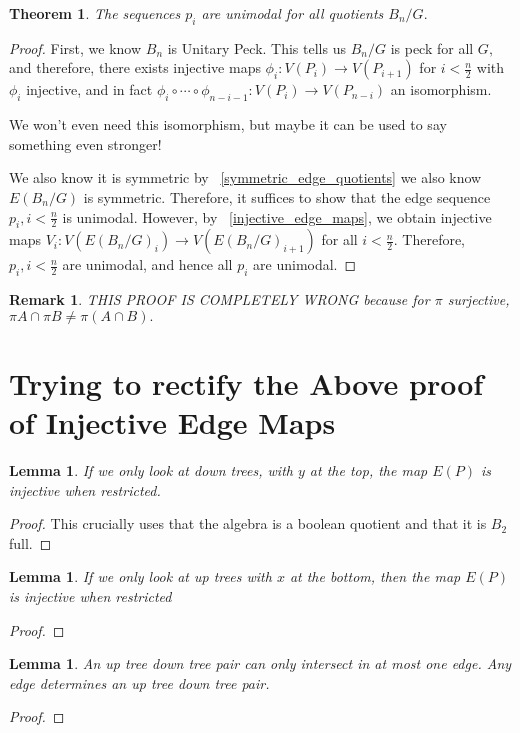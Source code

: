 \documentclass{amsart}
\newtheorem{lem}[subsubsection]{Lemma}
\newtheorem{thm}[subsubsection]{Theorem}
\newtheorem{rem}[subsubsection]{Remark}
\begin{document}
\begin{thm}
The sequences $p_i$ are unimodal for all quotients $B_n/G.$ 
\end{thm}
\begin{proof}
First, we know $B_n$ is Unitary Peck. This tells us $B_n/G$ is peck for all $G,$ and therefore, there exists injective maps $\phi_i:V(P_i) \rightarrow V(P_{i+1})$ for $i <\frac{n}{2}$	with $\phi_i$ injective, and in fact $\phi_i \circ \cdots \circ \phi_{n-i-1}:V(P_i) \rightarrow V(P_{n-i})$ an isomorphism.

We won't even need this isomorphism, but maybe it can be used to say something even stronger!

We also know it is symmetric by ~\ref{symmetric_edge_quotients} we also know $E(B_n/G)$ is symmetric. Therefore, it suffices to show that the edge sequence $p_i, i < \frac{n}{2}$ is unimodal. However, by ~\ref{injective_edge_maps}, we obtain injective maps $V_i:V(E(B_n/G)_i)\rightarrow V(E(B_n/G)_{i+1})$ for all $i < \frac{n}{2}.$ Therefore, $p_i,i<\frac{n}{2}$ are unimodal, and hence all $p_i$ are unimodal.

\end{proof}
\begin{rem}
THIS PROOF IS COMPLETELY WRONG because for $\pi $ surjective, $\pi A \cap \pi B \neq \pi (A \cap B).$

\end{rem}

\section{Trying to rectify the Above proof of Injective Edge Maps}

\begin{lem}
If we only look at down trees, with $y$ at the top, the map $E(P)$ is injective when restricted.
\end{lem}
\begin{proof}
This crucially uses that the algebra is a boolean quotient and that it is $B_2$ full.
\end{proof}

\begin{lem}
If we only look at up trees with $x$ at the bottom, then the map $E(P)$ is injective when restricted
\end{lem}
\begin{proof}
	
\end{proof}

\begin{lem}
An up tree down tree pair can only intersect in at most one edge. Any edge determines an up tree down tree pair.
\end{lem}
\begin{proof}

\end{proof}
\end{document}
